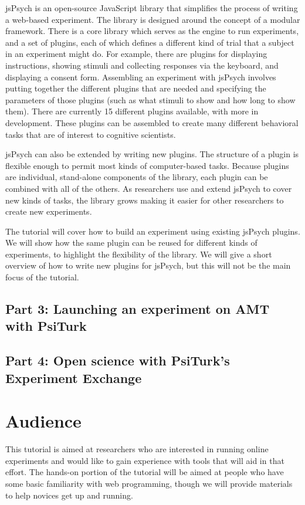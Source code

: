 \documentclass[10pt,letterpaper]{article}
\begin{document}
jsPsych is an open-source JavaScript library that simplifies the process of writing a web-based experiment. The library is designed around the concept of a modular framework. There is a core library which serves as the engine to run experiments, and a set of plugins, each of which defines a different kind of trial that a subject in an experiment might do. For example, there are plugins for displaying instructions, showing stimuli and collecting responses via the keyboard, and displaying a consent form. Assembling an experiment with jsPsych involves putting together the different plugins that are needed and specifying the parameters of those plugins (such as what stimuli to show and how long to show them). There are currently 15 different plugins available, with more in development. These plugins can be assembled to create many different behavioral tasks that are of interest to cognitive scientists.

jsPsych can also be extended by writing new plugins. The structure of a plugin is flexible enough to permit most kinds of computer-based tasks. Because plugins are individual, stand-alone components of the library, each plugin can be combined with all of the others. As researchers use and extend jsPsych to cover new kinds of tasks, the library grows making it easier for other researchers to create new experiments.

The tutorial will cover how to build an experiment using existing jsPsych plugins. We will show how the same plugin can be reused for different kinds of experiments, to highlight the flexibility of the library. We will give a short overview of how to write new plugins for jsPsych, but this will not be the main focus of the tutorial.

\subsection{Part 3: Launching an experiment on AMT with PsiTurk}


\subsection{Part 4: Open science with PsiTurk's Experiment Exchange}



\section{Audience}

This tutorial is aimed at researchers who are interested in running online experiments and would like to gain experience with tools that will aid in that effort. The hands-on portion of the tutorial will be aimed at people who have some basic familiarity with web programming, though we will provide materials to help novices get up and running. 
\end{document}
